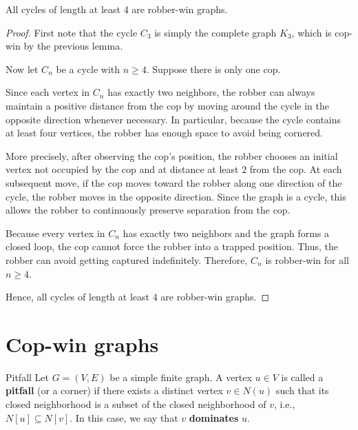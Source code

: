 \documentclass[12pt, a4paper]{article}
\begin{document}
\begin{lemma}{}{}
All cycles of length at least 4 are robber-win graphs.
\end{lemma}

\begin{proof}
First note that the cycle $C_3$ is simply the complete graph $K_3$, which is cop-win by the previous lemma.

Now let $C_n$ be a cycle with $n \geq 4$. Suppose there is only one cop.

Since each vertex in $C_n$ has exactly two neighbors, the robber can always maintain a positive distance from the cop by moving around the cycle in the opposite direction whenever necessary. In particular, because the cycle contains at least four vertices, the robber has enough space to avoid being cornered.

More precisely, after observing the cop's position, the robber chooses an initial vertex not occupied by the cop and at distance at least $2$ from the cop. At each subsequent move, if the cop moves toward the robber along one direction of the cycle, the robber moves in the opposite direction. Since the graph is a cycle, this allows the robber to continuously preserve separation from the cop.

Because every vertex in $C_n$ has exactly two neighbors and the graph forms a closed loop, the cop cannot force the robber into a trapped position. Thus, the robber can avoid getting captured indefinitely. Therefore, $C_n$ is robber-win for all $n \geq 4$.

Hence, all cycles of length at least $4$ are robber-win graphs.
\end{proof}
\newpage

\section{Cop-win graphs}

\begin{definition}{Pitfall}{}
Let $G = (V, E)$ be a simple finite graph. 
A vertex $u \in V$ is called a \textbf{pitfall} (or a corner) if there exists a distinct vertex $v \in N(u)$ such that its closed neighborhood is a subset of the closed neighborhood of $v$, i.e., $N[u] \subseteq N[v]$. In this case, we say that $v$ \textbf{dominates} $u$.
\end{definition}
\end{document}
